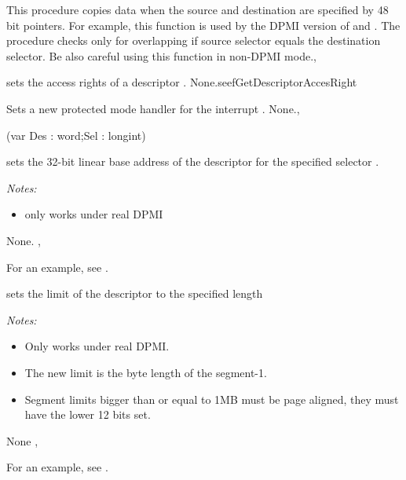 {This procedure copies data when the source and destination are specified
by 48 bit pointers. For example, this function is used by the DPMI version
of  and . }{The procedure checks only
for overlapping if source selector equals the destination selector. 
Be also careful using this function in non-DPMI
mode.}{,}

{ sets the access rights of a
descriptor .}
{None.}{seef{GetDescriptorAccesRight}}

{Sets a new protected mode handler for the interrupt .}
{None.}{, } 

{(var Des : word;Sel : longint)}
{ sets the 32-bit linear base address 
of the descriptor  for the specified selector .

{\em Notes:}
\begin{itemize}
\item only works under real DPMI
\end{itemize}
}
{None.}
{ , }

For an example, see .

{ sets the limit of the descriptor  
to the specified length 

{\em Notes:}
\begin{itemize}
\item Only works under real DPMI.
\item The new limit is the byte length of the segment-1.
\item Segment limits bigger than or equal to 1MB must be page aligned, they
must have the lower 12 bits set.
\end{itemize}
}
{None}
{ , }

For an example, see .

